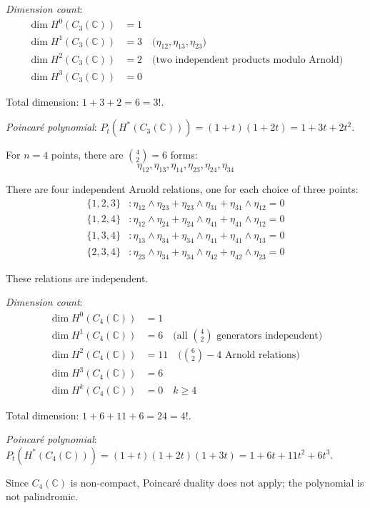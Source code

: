 \begin{example}[\texorpdfstring{$n=3$}{n=3}: the fundamental relation]
\emph{Dimension count}:
\begin{align}
\dim H^0(C_3(\mathbb{C})) &= 1\\
\dim H^1(C_3(\mathbb{C})) &= 3 \quad \text{(}\eta_{12}, \eta_{13}, \eta_{23}\text{)}\\
\dim H^2(C_3(\mathbb{C})) &= 2 \quad \text{(two independent products modulo Arnold)}\\
\dim H^3(C_3(\mathbb{C})) &= 0
\end{align}

Total dimension: $1 + 3 + 2 = 6 = 3!$.

\emph{Poincaré polynomial}: $P_t(H^*(C_3(\mathbb{C}))) = (1+t)(1+2t) = 1 + 3t + 2t^2$.
\end{example}

\begin{example}[\texorpdfstring{$n=4$}{n=4}: multiple relations]
\label{ex:arnold-n4-complete}

For $n=4$ points, there are $\binom{4}{2} = 6$ forms:
\begin{equation}
\eta_{12}, \eta_{13}, \eta_{14}, \eta_{23}, \eta_{24}, \eta_{34}
\end{equation}

There are four independent Arnold relations, one for each choice of three points:
\begin{align}
\{1,2,3\}&: \eta_{12} \wedge \eta_{23} + \eta_{23} \wedge \eta_{31} +
\eta_{31} \wedge \eta_{12} = 0\\
\{1,2,4\}&: \eta_{12} \wedge \eta_{24} + \eta_{24} \wedge \eta_{41} +
\eta_{41} \wedge \eta_{12} = 0\\
\{1,3,4\}&: \eta_{13} \wedge \eta_{34} + \eta_{34} \wedge \eta_{41} +
\eta_{41} \wedge \eta_{13} = 0\\
\{2,3,4\}&: \eta_{23} \wedge \eta_{34} + \eta_{34} \wedge \eta_{42} +
\eta_{42} \wedge \eta_{23} = 0
\end{align}

These relations are independent.

\emph{Dimension count}:
\begin{align}
\dim H^0(C_4(\mathbb{C})) &= 1\\
\dim H^1(C_4(\mathbb{C})) &= 6 \quad \text{(all $\binom{4}{2}$ generators independent)}\\
\dim H^2(C_4(\mathbb{C})) &= 11 \quad \text{($\binom{6}{2} - 4$ Arnold relations)}\\
\dim H^3(C_4(\mathbb{C})) &= 6\\
\dim H^k(C_4(\mathbb{C})) &= 0 \quad k \geq 4
\end{align}

Total dimension: $1 + 6 + 11 + 6 = 24 = 4!$.

\emph{Poincaré polynomial}: $P_t(H^*(C_4(\mathbb{C}))) = (1+t)(1+2t)(1+3t) = 1 + 6t + 11t^2 + 6t^3$.

Since $C_4(\mathbb{C})$ is non-compact, Poincar\'{e} duality does not apply; the polynomial is not palindromic.
\end{example}

